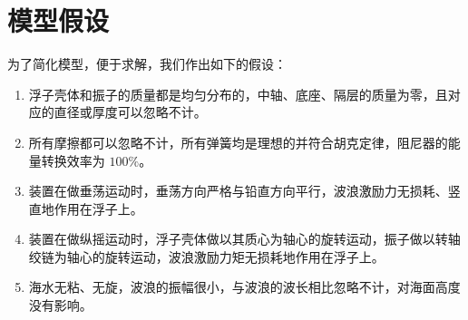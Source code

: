 \section{模型假设}

为了简化模型，便于求解，我们作出如下的假设：

\begin{enumerate}
    \item 浮子壳体和振子的质量都是均匀分布的，中轴、底座、隔层的质量为零，且对应的直径或厚度可以忽略不计。
    \item 所有摩擦都可以忽略不计，所有弹簧均是理想的并符合胡克定律，阻尼器的能量转换效率为 $100\%$。
    \item 装置在做垂荡运动时，垂荡方向严格与铅直方向平行，波浪激励力无损耗、竖直地作用在浮子上。
    \item 装置在做纵摇运动时，浮子壳体做以其质心为轴心\cite{huangyifan2014analysis, zhoubinghao2018float}的旋转运动，振子做以转轴绞链为轴心的旋转运动，波浪激励力矩无损耗地作用在浮子上。
    \item 海水无粘、无旋，波浪的振幅很小，与波浪的波长相比忽略不计，对海面高度没有影响。
\end{enumerate}